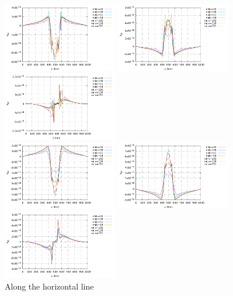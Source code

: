 \begin{center}
\includegraphics[width=5cm]{python_codes/fieldstone_26/results/case1a/horizontal_exx.pdf}
\includegraphics[width=5cm]{python_codes/fieldstone_26/results/case1a/horizontal_eyy.pdf}
\includegraphics[width=5cm]{python_codes/fieldstone_26/results/case1a/horizontal_exy.pdf}\\
\includegraphics[width=5cm]{python_codes/fieldstone_26/results/case1a/horizontal_exxn.pdf}
\includegraphics[width=5cm]{python_codes/fieldstone_26/results/case1a/horizontal_eyyn.pdf}
\includegraphics[width=5cm]{python_codes/fieldstone_26/results/case1a/horizontal_exyn.pdf}\\
{\captionfont Along the horizontal line}
\end{center}

